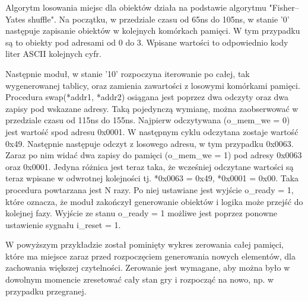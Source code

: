 \documentclass[polish,polish,a4paper]{article}
\begin{document}
Algorytm losowania miejsc dla obiektów działa na podstawie algorytmu "Fisher–Yates shuffle".
Na początku, w przedziale czasu od 65ns do 105ns, w stanie '0' następuje zapisanie obiektów w kolejnych komórkach pamięci.
W tym przypadku są to obiekty pod adresami od 0 do 3. Wpisane wartości to odpowiednio
kody liter ASCII kolejnych cyfr.

Następnie moduł, w stanie '10' rozpoczyna iterowanie po całej, tak wygenerowanej tablicy, oraz
zamienia zawartości z losowymi komórkami pamięci.
Procedura swap(*addr1, *addr2) osiągana jest poprzez dwa odczyty oraz dwa zapisy pod wskazane adresy.
Taką pojedynczą wymianę, można zaobserwować w przedziale czasu od 115ns do 155ns.
Najpierw odczytywana (o\_mem\_we = 0) jest wartość spod adresu 0x0001.
W następnym cyklu odczytana zostaje wartość 0x49.
Następnie następuje odczyt z losowego adresu, w tym przypadku 0x0063.
Zaraz po nim widać dwa zapisy do pamięci (o\_mem\_we = 1) pod adresy 0x0063 oraz 0x0001.
Jedyna różnica jest teraz taka, że wcześniej odczytane wartości są teraz wpisane w odwrotnej kolejności
tj. *0x0063 = 0x49, *0x0001 = 0x00.
Taka procedura powtarzana jest N razy.
Po niej ustawiane jest wyjście o\_ready = 1, które oznacza, że moduł zakończył generowanie obiektów
i logika może przejść do kolejnej fazy. Wyjście ze stanu o\_ready = 1 możliwe jest poprzez ponowne ustawienie
sygnału i\_reset = 1.

W powyższym przykładzie został pominięty wykres zerowania całej pamięci, które ma miejsce zaraz przed
rozpoczęciem generowania nowych elementów, dla zachowania większej czytelności.
Zerowanie jest wymagane, aby można było w dowolnym momencie zresetować cały stan gry i rozpocząć na nowo,
np. w przypadku przegranej.
\end{document}
